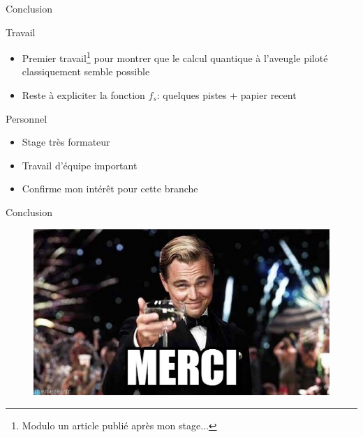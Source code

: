 \documentclass[]{beamer}
\begin{document}
\begin{frame}{Conclusion}
  \begin{block}{Travail}
    \begin{itemize}
    \item Premier travail\footnote{Modulo un article publié après mon stage...} pour montrer que le calcul quantique à l'aveugle piloté classiquement semble possible
    \item Reste à expliciter la fonction $f_s$: quelques pistes + papier recent
    \end{itemize}
  \end{block}
  \begin{block}{Personnel}
    \begin{itemize}
    \item Stage très formateur
    \item Travail d'équipe important
    \item Confirme mon intérêt pour cette branche
    \end{itemize}
  \end{block}
\end{frame}

\begin{frame}{Conclusion}
  \begin{figure}[ht]
    \centering
    \includegraphics[width=\textwidth,height=0.8\textheight,keepaspectratio]{figures/merci.jpg}
  \end{figure}
\end{frame}
\end{document}
